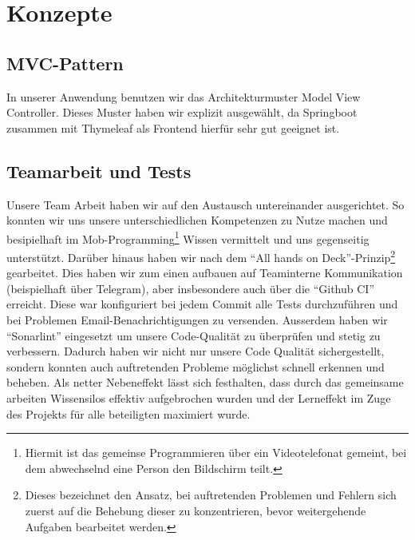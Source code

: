 \usepackage{csquotes}%
\section{Konzepte}

\subsection{MVC-Pattern}
In unserer Anwendung benutzen wir das Architekturmuster Model View Controller.
Dieses Muster haben wir explizit ausgewählt, da Springboot zusammen mit Thymeleaf als Frontend hierfür sehr gut geeignet ist.

\subsection{Teamarbeit und Tests}%
Unsere Team Arbeit haben wir auf den Austausch untereinander ausgerichtet.
So konnten wir uns unsere unterschiedlichen Kompetenzen zu Nutze machen und besipielhaft im Mob-Programming\footnote{Hiermit ist das gemeinse Programmieren über ein Videotelefonat gemeint, bei dem abwechselnd eine Person den Bildschirm teilt.} Wissen vermittelt und uns gegenseitig unterstützt.
Darüber hinaus haben wir nach dem \enquote{All hands on Deck}-Prinzip\footnote{Dieses bezeichnet den Ansatz, bei auftretenden Problemen und Fehlern sich zuerst auf die Behebung dieser zu konzentrieren, bevor weitergehende Aufgaben bearbeitet werden.} gearbeitet.
Dies haben wir zum einen aufbauen auf Teaminterne Kommunikation (beispielhaft über Telegram), aber insbesondere auch über die \enquote{Github CI} erreicht.
Diese war konfiguriert bei jedem Commit alle Tests durchzuführen und bei Problemen Email-Benachrichtigungen zu versenden.
Ausserdem haben wir \enquote{Sonarlint} eingesetzt um unsere Code-Qualität zu überprüfen und stetig zu verbessern.
Dadurch haben wir nicht nur unsere Code Qualität sichergestellt, sondern konnten auch auftretenden Probleme möglichst schnell erkennen und beheben.
Als netter Nebeneffekt lässt sich festhalten, dass durch das gemeinsame arbeiten Wissensilos effektiv aufgebrochen wurden und der Lerneffekt im Zuge des Projekts für alle beteiligten maximiert wurde.

